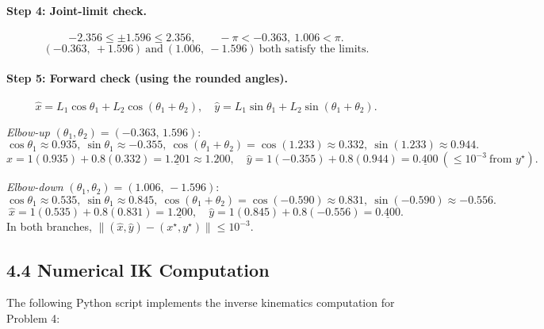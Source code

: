 \documentclass[11pt]{article}
\begin{document}
\paragraph{Step 4: Joint-limit check.}
\[
-2.356\le \pm 1.596 \le 2.356,\qquad -\pi< -0.363,\ 1.006 < \pi.
\]
\[
\boxed{(-0.363,\ +1.596)}\ \text{and}\ \boxed{(1.006,\ -1.596)}\ \text{both satisfy the limits.}
\]

\paragraph{Step 5: Forward check (using the rounded angles).}
\[
\hat x=L_1\cos\theta_1+L_2\cos(\theta_1+\theta_2),\quad
\hat y=L_1\sin\theta_1+L_2\sin(\theta_1+\theta_2).
\]

\emph{Elbow-up} $(\theta_1,\theta_2)=(-0.363,\,1.596)$:
\[
\cos\theta_1\approx 0.935,\ \sin\theta_1\approx -0.355,\ 
\cos(\theta_1+\theta_2)=\cos(1.233)\approx 0.332,\ 
\sin(1.233)\approx 0.944.
\]
\[
\hat x=1(0.935)+0.8(0.332)=\underline{1.201}\approx 1.200,\quad
\hat y=1(-0.355)+0.8(0.944)=\underline{0.400}\ (\le 10^{-3}\ \text{from }y^\star).
\]

\emph{Elbow-down} $(\theta_1,\theta_2)=(1.006,\,-1.596)$:
\[
\cos\theta_1\approx 0.535,\ \sin\theta_1\approx 0.845,\ 
\cos(\theta_1+\theta_2)=\cos(-0.590)\approx 0.831,\ 
\sin(-0.590)\approx -0.556.
\]
\[
\hat x=1(0.535)+0.8(0.831)=\underline{1.200},\quad
\hat y=1(0.845)+0.8(-0.556)=\underline{0.400}.
\]
In both branches, $\|(\hat x,\hat y)-(x^\star,y^\star)\|\le 10^{-3}$.

\subsection*{4.4 Numerical IK Computation}

The following Python script implements the inverse kinematics computation for Problem 4:
\end{document}
